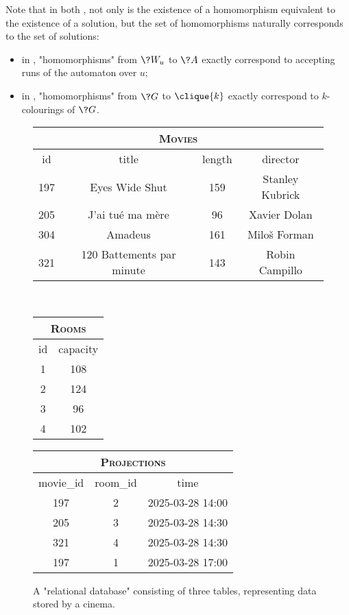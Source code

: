 Note that in both ,
not only is the existence of a homomorphism equivalent to the existence of a solution, but the set of homomorphisms naturally corresponds to the set of solutions:
\begin{itemize}
	\item in , "homomorphisms" from $\?W_u$ to $\?A$
		exactly correspond to accepting runs of the automaton over $u$;
	\item in , "homomorphisms" from $\?G$ to $\clique{k}$
		exactly correspond to $k$-colourings of $\?G$.
\end{itemize}

\begin{figure}
	\centering%
	{%
		\footnotesize%
		\begin{tabular}{cccc}
			\multicolumn{4}{c}{\textsc{Movies}} \\ \toprule
			id & title & length & director \\ \midrule
			197 & Eyes Wide Shut & 159 & Stanley Kubrick \\ 
			205 & J'ai tué ma mère & 96 & Xavier Dolan \\
			304 & Amadeus & 161 & Miloš Forman \\
			321 & 120 Battements par minute & 143 & Robin Campillo \\ \bottomrule
		\end{tabular}
		\\\bigskip%
		\begin{tabular}{cc}
			\multicolumn{2}{c}{\textsc{Rooms}} \\ \toprule
			id & capacity  \\ \midrule
			1 & 108 \\
			2 & 124 \\
			3 & 96 \\
			4 & 102 \\ \bottomrule
		\end{tabular}%
		\hspace{1cm}%
		\begin{tabular}{ccc}
			\multicolumn{3}{c}{\textsc{Projections}} \\ \toprule
			movie\_id & room\_id & time \\ \midrule
			197 & 2 & 2025-03-28 14:00 \\
			205 & 3 & 2025-03-28 14:30 \\
			321 & 4 & 2025-03-28 14:30 \\
			197 & 1 & 2025-03-28 17:00 \\ \bottomrule
		\end{tabular}
	}
	\caption{
		\AP\label{fig:example-db-as-rel}
		A "relational database" consisting of three tables, representing data
		stored by a cinema.
	}
\end{figure}
